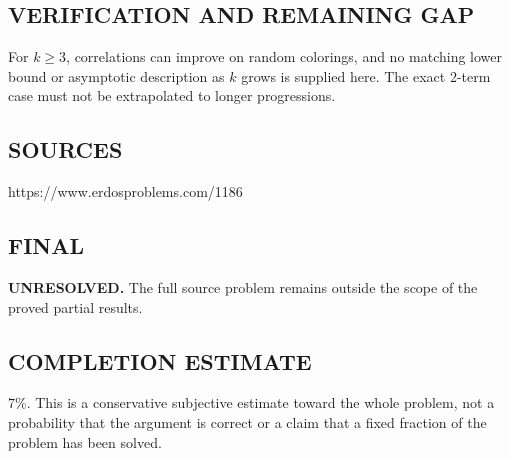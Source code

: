 \subsection*{VERIFICATION AND REMAINING GAP}
For $k\ge3$, correlations can improve on random colorings, and no matching
lower bound or asymptotic description as $k$ grows is supplied here. The exact
2-term case must not be extrapolated to longer progressions.

\subsection*{SOURCES}
https://www.erdosproblems.com/1186

\subsection*{FINAL}
\textbf{UNRESOLVED.} The full source problem remains outside the scope of the proved partial results.

\subsection*{COMPLETION ESTIMATE}
$7\%$. This is a conservative subjective estimate toward the whole problem, not a probability that the argument is correct or a claim that a fixed fraction of the problem has been solved.
